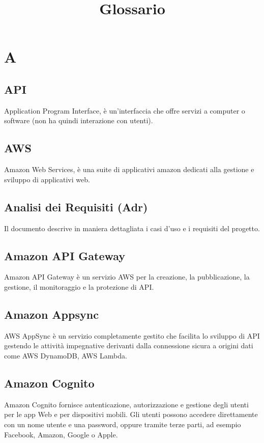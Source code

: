 \documentclass{classes/base}
\title{Glossario}
\author{\giulio}
\begin{document}
	\maketitle
	\newpage
	\tableofcontents

    \section{A}
        \subsection*{API}
        Application Program Interface, è un'interfaccia che offre servizi a computer o software (non ha quindi interazione con utenti).
       
        \subsection*{AWS}
        \label{sec:AWS}
        Amazon Web Services, è una suite di applicativi amazon dedicati alla gestione e sviluppo di applicativi web.

        \subsection*{Analisi dei Requisiti (Adr)}
        Il documento descrive in maniera dettagliata i casi d’uso e i requisiti del progetto.

        \subsection*{Amazon API Gateway}
        Amazon API Gateway è un servizio AWS per la creazione, la pubblicazione, la gestione, il monitoraggio e la protezione di API.

        \subsection*{Amazon Appsync}
        AWS AppSync è un servizio completamente gestito che facilita lo sviluppo di API gestendo le attività impegnative derivanti dalla connessione sicura a origini dati come AWS DynamoDB, AWS Lambda.

        \subsection*{Amazon Cognito}
        Amazon Cognito fornisce autenticazione, autorizzazione e gestione degli utenti per le app Web e per dispositivi mobili. Gli utenti possono accedere direttamente con un nome utente e una password, oppure tramite terze parti, ad esempio Facebook, Amazon, Google o Apple.
        
\end{document}
